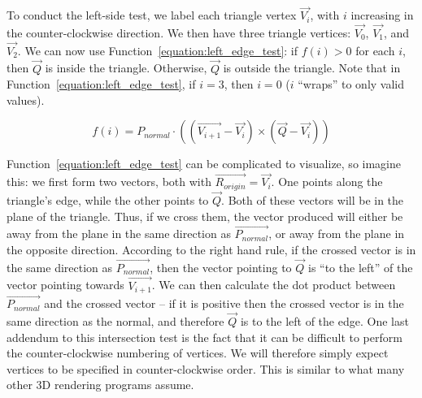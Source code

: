 \documentclass[11pt]{article}
\newcommand{\rayorg}{\vec{R_{origin}}}
\begin{document}
To conduct the left-side test, we label each triangle vertex $\vec{V_i}$, with $i$ increasing in the counter-clockwise direction.
We then have three triangle vertices: $\vec{V_0}$, $\vec{V_1}$, and $\vec{V_2}$.
We can now use Function~\ref{equation:left_edge_test}: if $f(i) > 0$ for each $i$, then $\vec{Q}$ is inside the triangle.
Otherwise, $\vec{Q}$ is outside the triangle.
Note that in Function~\ref{equation:left_edge_test}, if $i = 3$, then $i = 0$ ($i$ ``wraps'' to only valid values).

\begin{equation}
  \label{equation:left_edge_test}
  f(i) = P_{normal} \cdot ((\vec{V_{i+1}} - \vec{V_i}) \times (\vec{Q} - \vec{V_i}))
\end{equation}

Function~\ref{equation:left_edge_test} can be complicated to visualize, so imagine this: we first form two vectors, both with $\rayorg = \vec{V_i}$.
One points along the triangle's edge, while the other points to $\vec{Q}$.
Both of these vectors will be in the plane of the triangle.
Thus, if we cross them, the vector produced will either be away from the plane in the same direction as $\vec{P_{normal}}$, or away from the plane in the opposite direction.
According to the right hand rule, if the crossed vector is in the same direction as $\vec{P_{normal}}$, then the vector pointing to $\vec{Q}$ is ``to the left'' of the vector pointing towards $\vec{V_{i+1}}$.
We can then calculate the dot product between $\vec{P_{normal}}$ and the crossed vector -- if it is positive then the crossed vector is in the same direction as the normal, and therefore $\vec{Q}$ is to the left of the edge.
One last addendum to this intersection test is the fact that it can be difficult to perform the counter-clockwise numbering of vertices.
We will therefore simply expect vertices to be specified in counter-clockwise order.
This is similar to what many other 3D rendering programs assume.

%
\end{document}
